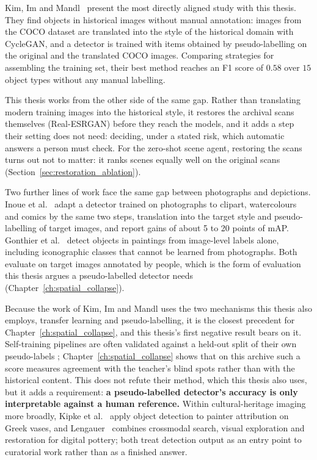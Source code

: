 \documentclass[12pt,a4paper]{report}
\begin{document}
Kim, Im and Mandl~\cite{kim2024historical_od} present the most directly aligned study with this thesis. They find objects in historical images without manual annotation: images from the COCO dataset are translated into the style of the historical domain with CycleGAN, and a detector is trained with items obtained by pseudo-labelling on the original and the translated COCO images. Comparing strategies for assembling the training set, their best method reaches an F1 score of $0.58$ over $15$ object types without any manual labelling.

This thesis works from the other side of the same gap. Rather than translating modern training images into the historical style, it restores the archival scans themselves (Real-ESRGAN) before they reach the models, and it adds a step their setting does not need: deciding, under a stated risk, which automatic answers a person must check. For the zero-shot scene agent, restoring the scans turns out not to matter: it ranks scenes equally well on the original scans (Section~\ref{sec:restoration_ablation}).

Two further lines of work face the same gap between photographs and depictions. Inoue et al.~\cite{inoue2018crossdomain} adapt a detector trained on photographs to clipart, watercolours and comics by the same two steps, translation into the target style and pseudo-labelling of target images, and report gains of about 5 to 20 points of mAP. Gonthier et al.~\cite{gonthier2018artworks} detect objects in paintings from image-level labels alone, including iconographic classes that cannot be learned from photographs. Both evaluate on target images annotated by people, which is the form of evaluation this thesis argues a pseudo-labelled detector needs (Chapter~\ref{ch:spatial_collapse}).

Because the work of Kim, Im and Mandl uses the two mechanisms this thesis also employs, transfer learning and pseudo-labelling, it is the closest precedent for Chapter~\ref{ch:spatial_collapse}, and this thesis's first negative result bears on it. Self-training pipelines are often validated against a held-out split of their own pseudo-labels \cite{pseudo_labeling2013,noisy_student2020}; Chapter~\ref{ch:spatial_collapse} shows that on this archive such a score measures agreement with the teacher's blind spots rather than with the historical content. This does not refute their method, which this thesis also uses, but it adds a requirement: \textbf{a pseudo-labelled detector's accuracy is only interpretable against a human reference.} Within cultural-heritage imaging more broadly, Kipke et al.~\cite{kipke2022} apply object detection to painter attribution on Greek vases, and Lengauer~\cite{lengauer2022} combines crossmodal search, visual exploration and restoration for digital pottery; both treat detection output as an entry point to curatorial work rather than as a finished answer.
\end{document}
